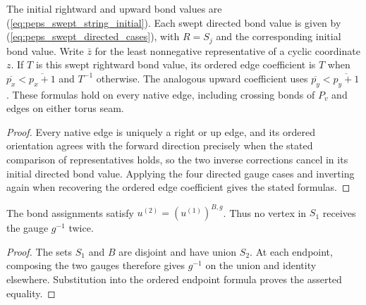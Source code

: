 \begin{lemma}%
    \label{thm:peps_torus_swept_string_transport}
    \leanok
    The initial rightward and upward bond values are
    (\ref{eq:peps_swept_string_initial}). Each swept directed bond value
    is given by (\ref{eq:peps_swept_directed_cases}), with $R=S_j$ and
    the corresponding initial bond value.
    Write $\bar z$ for the least nonnegative representative of a cyclic
    coordinate $z$. If $T$ is this swept rightward bond value, its ordered
    edge coefficient is $T$ when $\overline{p_x}<\overline{p_x+1}$ and
    $T^{-1}$ otherwise. The analogous upward coefficient uses
    $\overline{p_y}<\overline{p_y+1}$.
    These formulas hold on every native edge, including crossing bonds
    of $P_v$ and edges on either torus seam.
\end{lemma}

\begin{proof}\leanok
    Every native edge is uniquely a right or up edge, and its ordered
    orientation agrees with the forward direction precisely when the
    stated comparison of representatives holds, so the two inverse
    corrections cancel in its initial directed bond value.
    Applying the four directed gauge cases and inverting again when
    recovering the ordered edge coefficient gives the stated formulas.
\end{proof}

\begin{lemma}%
    \label{thm:peps_torus_swept_string_successive}
    \leanok
    The bond assignments satisfy $u^{(2)}=(u^{(1)})^{B,g}$.
    Thus no vertex in $S_1$ receives the gauge $g^{-1}$ twice.
\end{lemma}

\begin{proof}\leanok
    The sets $S_1$ and $B$ are disjoint and have union $S_2$.
    At each endpoint, composing the two gauges therefore gives
    $g^{-1}$ on the union and identity elsewhere. Substitution into
    the ordered endpoint formula proves the asserted equality.
\end{proof}


